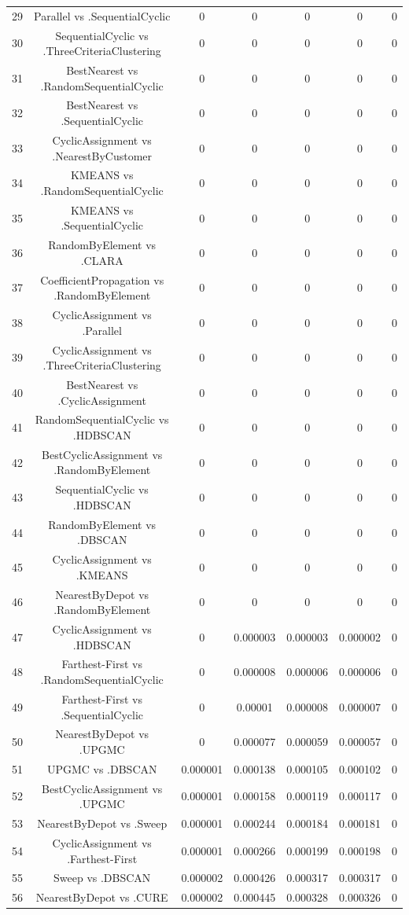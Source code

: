 \documentclass[a4paper,10pt]{article}
\begin{document}
\begin{landscape}
\begin{table}[!htp]
\begin{tabular}{ccccccc}
29&Parallel vs .SequentialCyclic&0&0&0&0&0\\
30&SequentialCyclic vs .ThreeCriteriaClustering&0&0&0&0&0\\
31&BestNearest vs .RandomSequentialCyclic&0&0&0&0&0\\
32&BestNearest vs .SequentialCyclic&0&0&0&0&0\\
33&CyclicAssignment vs .NearestByCustomer&0&0&0&0&0\\
34&KMEANS vs .RandomSequentialCyclic&0&0&0&0&0\\
35&KMEANS vs .SequentialCyclic&0&0&0&0&0\\
36&RandomByElement vs .CLARA&0&0&0&0&0\\
37&CoefficientPropagation vs .RandomByElement&0&0&0&0&0\\
38&CyclicAssignment vs .Parallel&0&0&0&0&0\\
39&CyclicAssignment vs .ThreeCriteriaClustering&0&0&0&0&0\\
40&BestNearest vs .CyclicAssignment&0&0&0&0&0\\
41&RandomSequentialCyclic vs .HDBSCAN&0&0&0&0&0\\
42&BestCyclicAssignment vs .RandomByElement&0&0&0&0&0\\
43&SequentialCyclic vs .HDBSCAN&0&0&0&0&0\\
44&RandomByElement vs .DBSCAN&0&0&0&0&0\\
45&CyclicAssignment vs .KMEANS&0&0&0&0&0\\
46&NearestByDepot vs .RandomByElement&0&0&0&0&0\\
47&CyclicAssignment vs .HDBSCAN&0&0.000003&0.000003&0.000002&0\\
48&Farthest-First vs .RandomSequentialCyclic&0&0.000008&0.000006&0.000006&0\\
49&Farthest-First vs .SequentialCyclic&0&0.00001&0.000008&0.000007&0\\
50&NearestByDepot vs .UPGMC&0&0.000077&0.000059&0.000057&0\\
51&UPGMC vs .DBSCAN&0.000001&0.000138&0.000105&0.000102&0\\
52&BestCyclicAssignment vs .UPGMC&0.000001&0.000158&0.000119&0.000117&0\\
53&NearestByDepot vs .Sweep&0.000001&0.000244&0.000184&0.000181&0\\
54&CyclicAssignment vs .Farthest-First&0.000001&0.000266&0.000199&0.000198&0\\
55&Sweep vs .DBSCAN&0.000002&0.000426&0.000317&0.000317&0\\
56&NearestByDepot vs .CURE&0.000002&0.000445&0.000328&0.000326&0\\

\end{tabular}
\end{table}
\end{landscape}
\end{document}
